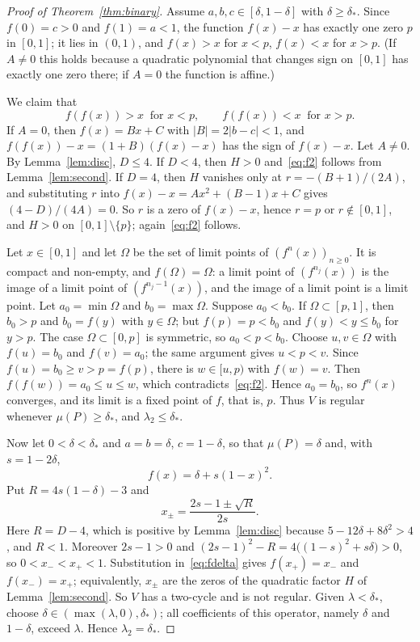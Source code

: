 \documentclass[11pt]{amsart}
\theoremstyle{definition}
\theoremstyle{remark}
\begin{document}
\begin{proof}[Proof of Theorem~\ref{thm:binary}]
Assume $a,b,c\in[\delta,1-\delta]$ with $\delta\ge\delta_*$. Since $f(0)=c>0$ and $f(1)=a<1$, the function $f(x)-x$ has
exactly one zero $p$ in $[0,1]$; it lies in $(0,1)$, and $f(x)>x$ for $x<p$, $f(x)<x$ for $x>p$. (If $A\ne0$ this holds
because a quadratic polynomial that changes sign on $[0,1]$ has exactly one zero there; if $A=0$ the function is
affine.)

We claim that
\begin{equation}\label{eq:f2}
f(f(x))>x\ \text{ for } x<p,\qquad f(f(x))<x\ \text{ for } x>p .
\end{equation}
If $A=0$, then $f(x)=Bx+C$ with $|B|=2|b-c|<1$, and $f(f(x))-x=(1+B)(f(x)-x)$ has the sign of $f(x)-x$. Let $A\ne0$. By
Lemma~\ref{lem:disc}, $D\le4$. If $D<4$, then $H>0$ and~\eqref{eq:f2} follows from Lemma~\ref{lem:second}. If $D=4$,
then $H$ vanishes only at $r=-(B+1)/(2A)$, and substituting $r$ into $f(x)-x=Ax^2+(B-1)x+C$ gives $(4-D)/(4A)=0$.
So $r$ is a zero of $f(x)-x$, hence $r=p$ or $r\notin[0,1]$, and $H>0$ on $[0,1]\setminus\{p\}$; again~\eqref{eq:f2}
follows.

Let $x\in[0,1]$ and let $\Omega$ be the set of limit points of $(f^n(x))_{n\ge0}$. It is compact and non-empty, and
$f(\Omega)=\Omega$: a limit point of $(f^{n_j}(x))$ is the image of a limit point of $(f^{n_j-1}(x))$, and the image of
a limit point is a limit point. Let $a_0=\min\Omega$ and $b_0=\max\Omega$. Suppose $a_0<b_0$. If $\Omega\subset[p,1]$,
then $b_0>p$ and $b_0=f(y)$ with $y\in\Omega$; but $f(p)=p<b_0$ and $f(y)<y\le b_0$ for $y>p$. The case
$\Omega\subset[0,p]$ is symmetric, so $a_0<p<b_0$. Choose $u,v\in\Omega$ with $f(u)=b_0$ and $f(v)=a_0$; the same
argument gives $u<p<v$. Since $f(u)=b_0\ge v>p=f(p)$, there is $w\in[u,p)$ with $f(w)=v$. Then
$f(f(w))=a_0\le u\le w$, which contradicts~\eqref{eq:f2}. Hence $a_0=b_0$, so $f^n(x)$ converges, and its limit is a
fixed point of $f$, that is, $p$. Thus $V$ is regular whenever $\mu(P)\ge\delta_*$, and $\lambda_2\le\delta_*$.

Now let $0<\delta<\delta_*$ and $a=b=\delta$, $c=1-\delta$, so that $\mu(P)=\delta$ and, with $s=1-2\delta$,
\begin{equation}\label{eq:fdelta}
f(x)=\delta+s(1-x)^2 .
\end{equation}
Put $R=4s(1-\delta)-3$ and
\[
x_\pm=\frac{2s-1\pm\sqrt R}{2s}.
\]
Here $R=D-4$, which is positive by Lemma~\ref{lem:disc} because $5-12\delta+8\delta^2>4$, and $R<1$. Moreover $2s-1>0$
and $(2s-1)^2-R=4\bigl((1-s)^2+s\delta\bigr)>0$, so $0<x_-<x_+<1$. Substitution in~\eqref{eq:fdelta} gives
$f(x_+)=x_-$ and $f(x_-)=x_+$; equivalently, $x_\pm$ are the zeros of the quadratic factor $H$ of
Lemma~\ref{lem:second}. So $V$ has a two-cycle and is not regular. Given $\lambda<\delta_*$, choose
$\delta\in(\max(\lambda,0),\delta_*)$; all coefficients of this operator, namely $\delta$ and $1-\delta$, exceed
$\lambda$. Hence $\lambda_2=\delta_*$.
\end{proof}
\end{document}
